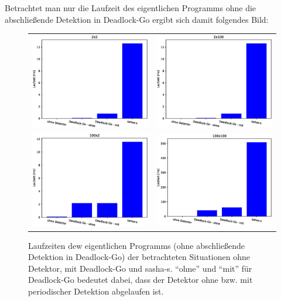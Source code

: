 Betrachtet man nur die Laufzeit des eigentlichen Programms ohne die abschließende 
Detektion in Deadlock-Go ergibt sich damit folgendes Bild:
\begin{figure}[H]
    \begin{tabular}{cc}
        \includegraphics[width=.47\textwidth]{img/2x2_runtime.eps} & \includegraphics[width=.47\textwidth]{img/2x100_runtime.eps}\\
        \includegraphics[width=.47\textwidth]{img/100x2_runtime.eps} & \includegraphics[width=.47\textwidth]{img/100x100_runtime.eps}\\
    \end{tabular}
    \caption{Laufzeiten dew eigentlichen Programms (ohne abschließende Detektion 
    in Deadlock-Go) der betrachteten Situationen ohne Detektor, mit Deadlock-Go und sasha-s. ``ohne'' und ``mit''
    für Deadlock-Go bedeutet dabei, dass der Detektor ohne bzw. mit periodischer 
    Detektion abgelaufen ist.}
\end{figure}
